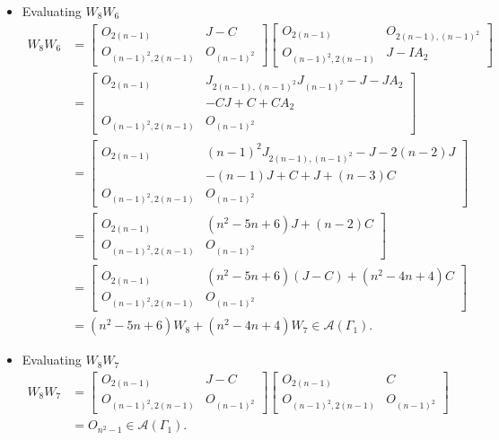 \begin{itemize}
    \item Evaluating $W_8W_6$
    \begin{align*}
        W_8W_6
        &= \begin{bmatrix}
            O_{2(n-1)} & J-C \\
            O_{(n-1)^2, 2(n-1)} & O_{(n-1)^2}
        \end{bmatrix}\begin{bmatrix}
            O_{2(n-1)} & O_{2(n-1), (n-1)^2} \\
            O_{(n-1)^2, 2(n-1)} & J-IA_2
        \end{bmatrix}\\
        &= \begin{bmatrix}
            O_{2(n-1)} & J_{2(n-1),(n-1)^2}J_{(n-1)^2}-J-JA_2\\& -CJ + C + CA_2 \\
            O_{(n-1)^2, 2(n-1)} & O_{(n-1)^2}
        \end{bmatrix}\\
        &= \begin{bmatrix}
            O_{2(n-1)} & (n-1)^2J_{2(n-1),(n-1)^2} -J - 2(n-2)J \\&- (n-1)J + C + J + (n-3)C \\
            O_{(n-1)^2, 2(n-1)} & O_{(n-1)^2}
        \end{bmatrix}\\
        &= \begin{bmatrix}
            O_{2(n-1)} & (n^2-5n+6)J + (n-2)C \\
            O_{(n-1)^2, 2(n-1)} & O_{(n-1)^2}
        \end{bmatrix}\\
        &= \begin{bmatrix}
            O_{2(n-1)} & (n^2-5n+6)(J -C) + (n^2-4n+4)C \\
            O_{(n-1)^2, 2(n-1)} & O_{(n-1)^2}
        \end{bmatrix}\\
        &= (n^2-5n+6)W_8 + (n^2-4n+4)W_7\in\mathcal{A}(\Gamma_1).
    \end{align*}
    
    \item Evaluating $W_8W_7$
    \begin{align*}
        W_8W_7
        &= \begin{bmatrix}
            O_{2(n-1)} & J-C \\
            O_{(n-1)^2, 2(n-1)} & O_{(n-1)^2}
        \end{bmatrix}\begin{bmatrix}
            O_{2(n-1)} & C \\
            O_{(n-1)^2, 2(n-1)} & O_{(n-1)^2}
        \end{bmatrix}\\
        &= O_{n^2-1}\in\mathcal{A}(\Gamma_1).
    \end{align*}
    

\end{itemize}
